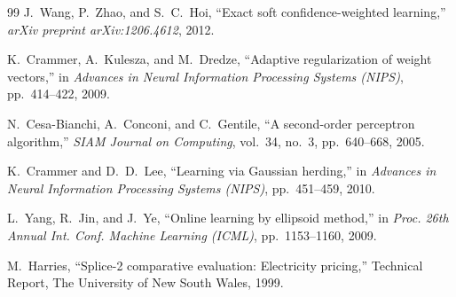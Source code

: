 \documentclass[12pt,a4paper]{article}
\begin{document}
\begin{thebibliography}{99}
		J.~Wang, P.~Zhao, and S.~C.~Hoi,
		``Exact soft confidence-weighted learning,''
		\textit{arXiv preprint arXiv:1206.4612}, 2012.
		
		K.~Crammer, A.~Kulesza, and M.~Dredze,
		``Adaptive regularization of weight vectors,''
		in \textit{Advances in Neural Information Processing Systems (NIPS)}, pp.~414--422, 2009.
		
		N.~Cesa-Bianchi, A.~Conconi, and C.~Gentile,
		``A second-order perceptron algorithm,''
		\textit{SIAM Journal on Computing}, vol.~34, no.~3, pp.~640--668, 2005.
		
		K.~Crammer and D.~D.~Lee,
		``Learning via Gaussian herding,''
		in \textit{Advances in Neural Information Processing Systems (NIPS)}, pp.~451--459, 2010.
		
		L.~Yang, R.~Jin, and J.~Ye,
		``Online learning by ellipsoid method,''
		in \textit{Proc. 26th Annual Int. Conf. Machine Learning (ICML)}, pp.~1153--1160, 2009.
		
		M.~Harries,
		``Splice-2 comparative evaluation: Electricity pricing,''
		Technical Report, The University of New South Wales, 1999.
		
	\end{thebibliography}
	
\end{document}
